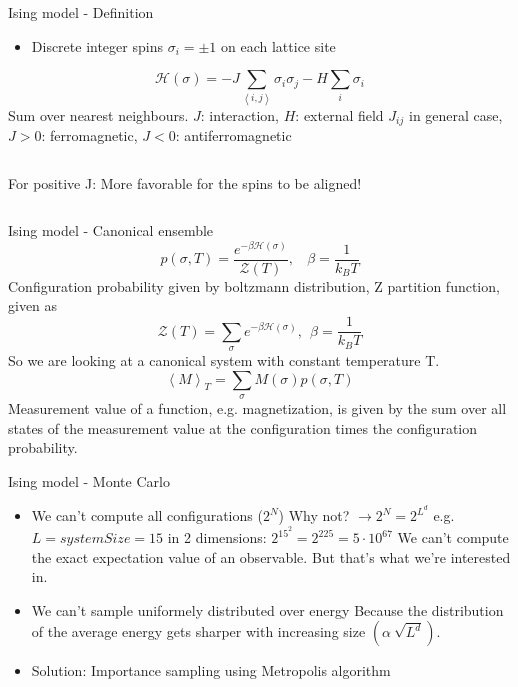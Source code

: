 \documentclass[handout]{beamer}
\begin{document}
\begin{frame}{Ising model - Definition}
\begin{itemize}
	 {Lattice with \(N\) sites.}
\item<2-> Discrete integer spins \( \sigma_i = \pm 1 \) on each lattice site
\end{itemize}
\pause[3]
\[ \mathscr{H}(\sigma) = -J \sum\limits_{\left< i, j \right>} \sigma_i \sigma_j - H \sum\limits_i \sigma_i \]
	 {Sum over nearest neighbours.}
	 {\( J \): interaction, \( H \): external field}
	 {\( J_{ij} \) in general case, \( J>0 \): ferromagnetic, \( J<0 \): antiferromagnetic}

\begin{columns}[c]
	\pause
	\def\svgwidth{.5\textwidth}
	\centering
	
	\pause
	\def\svgwidth{.5\textwidth}
	\centering
	
		 {For positive J: More favorable for the spins to be aligned!}
\end{columns}
\end{frame}

\begin{frame}{Ising model - Canonical ensemble}
\pause
\[ p(\sigma, T) = \frac{e^{-\beta \mathscr{H}(\sigma)}}{\mathscr{Z}(T)}, \ \ \ \ \beta=\frac{1}{k_B T}\]
	 {Configuration probability given by boltzmann distribution, Z partition function, given as \[ \mathscr{Z}(T) = \sum_\sigma e^{-\beta \mathscr{H}(\sigma)},\ \ \beta = \frac{1}{k_B T} \]}
	 {So we are looking at a canonical system with constant temperature T.}
\pause
\[ \left< M \right>_T = \sum_\sigma M(\sigma)p(\sigma,T) \]
	 {Measurement value of a function, e.g. magnetization, is given by the sum over all states of the measurement value at the configuration times the configuration probability.}
\end{frame}

\begin{frame}{Ising model - Monte Carlo}
\begin{itemize}
\item<2-> We can't compute all configurations (\(2^N\))
	 {Why not? \( \rightarrow 2^N = 2^{L^d} \) e.g. \( L = systemSize = 15 \) in 2 dimensions: \(2^{15^2} = 2^{225} = 5 \cdot 10^{67}\)}
	 {We can't compute the exact expectation value of an observable. But that's what we're interested in.}
\item<3-> We can't sample uniformely distributed over energy \def\svgwidth{12em} 
	 {Because the distribution of the average energy gets sharper with increasing size \(\left(\alpha \ \sqrt{L^d}\right)\).}
\item<4-> Solution: Importance sampling using Metropolis algorithm
\end{itemize}
\end{frame}
\end{document}
